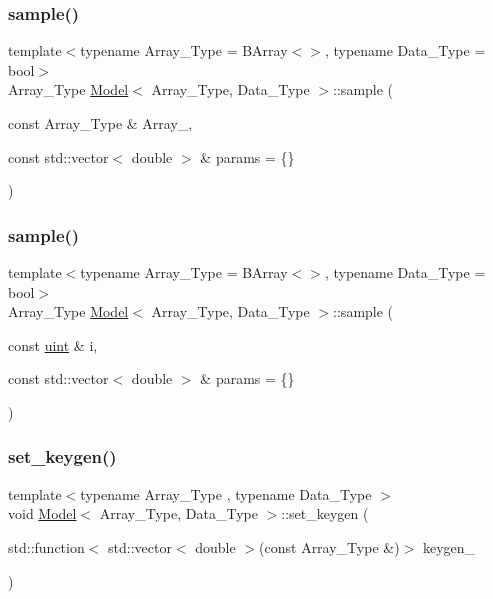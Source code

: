 \subsubsection{\texorpdfstring{sample()}{sample()}\hspace{0.1cm}{\footnotesize\ttfamily [1/2]}}
{\footnotesize\ttfamily template$<$typename Array\+\_\+\+Type  = B\+Array$<$$>$, typename Data\+\_\+\+Type  = bool$>$ \\
Array\+\_\+\+Type \hyperlink{class_model}{Model}$<$ Array\+\_\+\+Type, Data\+\_\+\+Type $>$\+::sample (\begin{DoxyParamCaption}\item[{const Array\+\_\+\+Type \&}]{Array\+\_\+,  }\item[{const std\+::vector$<$ double $>$ \&}]{params = {\ttfamily \{\}} }\end{DoxyParamCaption})}

\mbox{\label{class_model_a6cd63c3177775e07b20a64baa62daa39}} 
\subsubsection{\texorpdfstring{sample()}{sample()}\hspace{0.1cm}{\footnotesize\ttfamily [2/2]}}
{\footnotesize\ttfamily template$<$typename Array\+\_\+\+Type  = B\+Array$<$$>$, typename Data\+\_\+\+Type  = bool$>$ \\
Array\+\_\+\+Type \hyperlink{class_model}{Model}$<$ Array\+\_\+\+Type, Data\+\_\+\+Type $>$\+::sample (\begin{DoxyParamCaption}\item[{const \hyperlink{typedefs_8hpp_a91ad9478d81a7aaf2593e8d9c3d06a14}{uint} \&}]{i,  }\item[{const std\+::vector$<$ double $>$ \&}]{params = {\ttfamily \{\}} }\end{DoxyParamCaption})}

\mbox{\label{class_model_afa4736153fa419e1f141839eda735dfe}} 
\subsubsection{\texorpdfstring{set\+\_\+keygen()}{set\_keygen()}}
{\footnotesize\ttfamily template$<$typename Array\+\_\+\+Type , typename Data\+\_\+\+Type $>$ \\
void \hyperlink{class_model}{Model}$<$ Array\+\_\+\+Type, Data\+\_\+\+Type $>$\+::set\+\_\+keygen (\begin{DoxyParamCaption}\item[{std\+::function$<$ std\+::vector$<$ double $>$(const Array\+\_\+\+Type \&)$>$}]{keygen\+\_\+ }\end{DoxyParamCaption})\hspace{0.3cm}{\ttfamily [inline]}}



